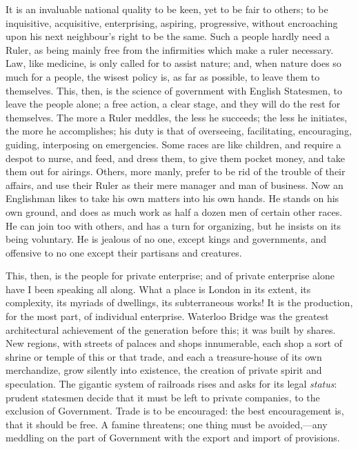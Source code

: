 It is an invaluable national quality to be keen,
yet to be fair to others; to be inquisitive, acquisitive,
enterprising, aspiring, progressive, without encroaching upon his next
neighbour's right to be the same. Such a people hardly need a Ruler,
as being mainly free from the infirmities which make a ruler
necessary. Law, like medicine, is only called for to assist nature;
and, when nature does so much for a people, the wisest policy is, as
far as possible, to leave them to themselves. This, then, is the
science of government with English Statesmen, to leave the people
alone; a free action, a clear stage, and they will do the rest for
themselves. The more a Ruler meddles, the less he succeeds; the less
he initiates, the more he accomplishes; his duty is that of
overseeing, facilitating, encouraging, guiding, interposing on
emergencies. Some races are like children, and require a despot to
nurse, and feed, and dress them, to give them pocket money, and take
them out for airings. Others, more manly, prefer to be rid of the
trouble of their affairs, and use their Ruler as their mere manager
and man of business. Now an Englishman likes to take his own matters
into his own hands. He stands on his own ground, and does as much work
as half a dozen men of certain other races. He can join too with
others, and has a turn for organizing, but he insists on its being
voluntary. He is jealous of no one, except kings and governments, and
offensive to no one except their partisans and creatures.

This, then, is the people for private enterprise;
and of private enterprise alone have I been speaking all along. What a
place is London in its extent, its complexity, its myriads of
dwellings, its subterraneous works! It is the production, for the most
part, of individual enterprise. Waterloo Bridge was the greatest
architectural achievement of the generation before this; it was built
by shares. New regions, with streets of palaces and shops innumerable,
each shop a sort of shrine or temple of this or that trade, and each a
treasure-house of its own merchandize, grow silently into existence,
the creation of private spirit and speculation. The gigantic system of
railroads rises and asks for its legal \emph{status}: prudent
statesmen decide that it must be left to private companies, to the
exclusion of Government. Trade is to be encouraged: the best
encouragement is, that it should be free. A famine threatens; one
thing must be avoided,—any meddling on the part of Government with
the export and import of provisions.

